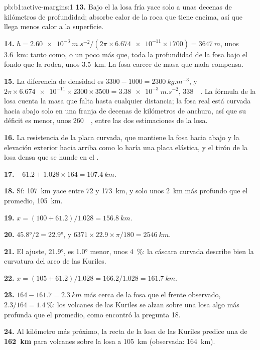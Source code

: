 \begin{solution}{pb:b1:active-margins:1}
\textbf{13.} Bajo el  la losa fría yace solo a unas decenas de kilómetros de profundidad; absorbe calor de la roca que tiene encima,
así que llega menos calor a la superficie.

\textbf{14.} $h = \qty{2.60e-3}{m.s^{-2}}/(2\pi\times\num{6.674e-11}\times1700)
= \qty{3647}{m}$, unos \qty{3.6}{km}: tanto como, o un poco más que, toda la profundidad de la fosa bajo el fondo que la rodea, unos
\qty{3.5}{km}. La fosa carece de masa que nada compensa.

\textbf{15.} La diferencia de densidad es $3300 - 1000 = \qty{2300}{kg.m^{-3}}$,
y $2\pi\times\num{6.674e-11}\times2300\times3500 = \qty{3.38e-3}{m.s^{-2}}$,
\qty{338}{\milli\gal}. La fórmula de la losa cuenta la masa que falta hasta cualquier
distancia; la fosa real está curvada hacia abajo solo en una franja de decenas de kilómetros
de anchura, así que su déficit es menor, unos \qty{260}{\milli\gal}, entre las dos
estimaciones de la losa.

\textbf{16.} La resistencia de la placa curvada, que mantiene la fosa hacia abajo y la elevación exterior hacia arriba como lo haría una placa
elástica, y el tirón de la losa densa que se hunde en el .

\textbf{17.} $-61.2 + 1.028\times164 = \qty{107.4}{km}$.

\textbf{18.} Sí: \qty{107}{km} yace entre 72 y \qty{173}{km}, y solo unos
\qty{2}{km} más profundo que el promedio, \qty{105}{km}.

\textbf{19.} $x = (100 + 61.2)/1.028 = \qty{156.8}{km}$.

\textbf{20.} $\ang{45.8}/2 = \ang{22.9}$, y
$6371\times22.9\times\pi/180 = \qty{2546}{km}$.

\textbf{21.} El ajuste, \ang{21.9}, es \ang{1.0} menor, unos
\qty{4}{\percent}: la cáscara curvada describe bien la curvatura del arco de las Kuriles.

\textbf{22.} $x = (105 + 61.2)/1.028 = 166.2/1.028 = \qty{161.7}{km}$.

\textbf{23.} $164 - 161.7 = \qty{2.3}{km}$ más cerca de la fosa que el frente
observado, $2.3/164 = \qty{1.4}{\percent}$: los volcanes de las Kuriles se alzan sobre una losa
algo más profunda que el promedio, como encontró la pregunta 18.

\textbf{24.} Al kilómetro más próximo, la recta de la losa de las Kuriles predice una  de
\textbf{\qty[text-series-to-math=true]{162}{km}} para volcanes sobre la losa a \qty{105}{km} (observada: \qty{164}{km}).
\end{solution}
